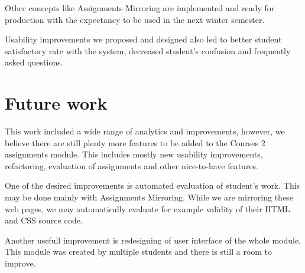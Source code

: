 Other concepts like Assignments Mirroring are implemented and ready for production with the expectancy to be used in the next winter semester.

Usability improvements we proposed and designed also led to better student satisfactory rate with the system, decreased student's confusion and frequently asked questions.


\section*{Future work}
This  work included a wide range of analytics and improvements, however, we believe there are still plenty more features to be added to the Courses 2 assignments module. This includes mostly new usability improvements, refactoring, evaluation of assignments and other nice-to-have features.

One of the desired improvements is automated evaluation of student's work. This may be done mainly with Assignments Mirroring. While we are mirroring these web pages, we may automatically evaluate for example validity of their HTML and CSS source code.

Another usefull improvement is redesigning of user interface of the whole module. This module was created by multiple students and there is still a room to improve.
